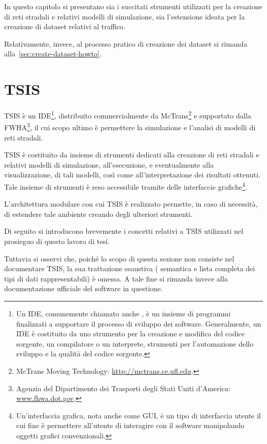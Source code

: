 In questo capitolo si presentano sia i succitati strumenti utilizzati per la creazione di reti stradali e relativi modelli di simulazione, sia l'estensione ideata per la creazione di dataset relativi al traffico.

Relativamente, invece, al processo pratico di creazione dei dataset si rimanda alla~\autoref{sec:create-dataset-howto}.

\cleardoublepage
\section{TSIS}
\label{sec:tsis}
\acf{TSIS} è un \acl{IDE}\footnote{Un \acl{IDE}, comunemente chiamato anche , è un insieme di programmi finalizzati a supportare il processo di sviluppo dei software. Generalmente, un \acs{IDE} è costituito da uno strumento per la creazione e modifica del codice sorgente, un compilatore o un interprete, strumenti per l'automazione dello sviluppo e la qualità del codice sorgente.}, distribuito commercialmente da McTrans\footnote{McTrans Moving Technology: \url{http://mctrans.ce.ufl.edu}.} e supportato dalla \acf{FWHA}\footnote{Agenzia del Dipartimento dei Trasporti degli Stati Uniti d'America: \\ \url{www.fhwa.dot.gov}.}, il cui scopo ultimo è permettere la simulazione e l'analisi di modelli di reti stradali.

\acs{TSIS} è costituito da insieme di strumenti dedicati alla creazione di reti stradali e relativi modelli di simulazione, all'esecuzione, e eventualmente alla visualizzazione, di tali modelli, così come all'interpretazione dei risultati ottenuti. Tale insieme di strumenti è reso accessibile tramite delle interfaccie grafiche\footnote{Un'interfaccia grafica, nota anche come \acf{GUI}, è un tipo di interfaccia utente il cui fine è permettere all'utente di interagire con il software manipolando oggetti grafici convenzionali.}.

L'architettura modulare con cui \acs{TSIS} è realizzato permette, in caso di necessità, di estendere tale ambiente creando degli ulteriori strumenti.

Di seguito si introducono brevemente i concetti relativi a \acs{TSIS} utilizzati nel prosieguo di questo lavoro di tesi.

Tuttavia si osservi che, poiché lo scopo di questa sezione non consiste nel documentare \acs{TSIS}, la sua trattazione esaustiva (\eg{} semantica e lista completa dei tipi di dati rappresentabili) è omessa. A tale fine si rimanda invece alla documentazione ufficiale del software in questione.

